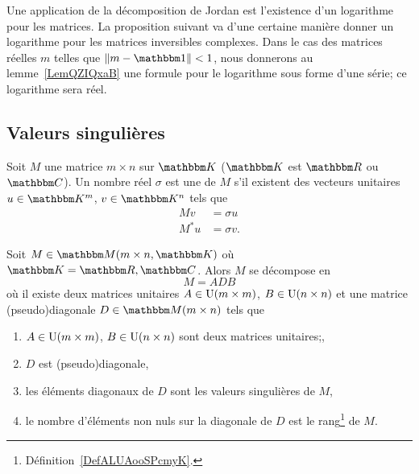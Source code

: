 Une application de la décomposition de Jordan est l'existence d'un logarithme pour les matrices. La proposition suivant va d'une certaine manière donner un logarithme pour les matrices inversibles complexes. Dans le cas des matrices réelles \( m\) telles que \( \| m-\mtu \|<1\), nous donnerons au lemme~\ref{LemQZIQxaB} une formule pour le logarithme sous forme d'une série; ce logarithme sera réel.

\subsection{Valeurs singulières}

\begin{definition}
    Soit \( M\) une matrice \( m\times n\) sur \( \eK\) (\( \eK\) est \( \eR\) ou \( \eC\)). Un nombre réel \( \sigma\) est une  de \( M\) s'il existent des vecteurs unitaires \( u\in \eK^m\), \( v\in \eK^n\) tels que
    \begin{subequations}
        \begin{align}
            Mv&=\sigma u\\
            M^*u&=\sigma v.
        \end{align}
    \end{subequations}
\end{definition}

\begin{theorem}
    Soit \( M\in \eM(m\times n,\eK)\) où \( \eK=\eR,\eC\). Alors \( M\) se décompose en
    \begin{equation}
        M=ADB
    \end{equation}
    où
    il existe deux matrices unitaires \( A\in \operatorname{U}(m\times m)\), \( B\in \operatorname{U}(n\times n)\) et une matrice (pseudo)diagonale \( D\in \eM(m\times n)\) tels que
    \begin{enumerate}
        \item
            \( A\in\operatorname{U}(m\times m)\), \( B\in\operatorname{U}(n\times n)\) sont deux matrices unitaires;,
        \item
            \( D\) est (pseudo)diagonale,
        \item
            les éléments diagonaux de \( D\) sont les valeurs singulières de \( M\),
        \item
            le nombre d'éléments non nuls sur la diagonale de \( D\) est le rang\footnote{Définition~\ref{DefALUAooSPcmyK}.} de \( M\).
    \end{enumerate}
\end{theorem}

